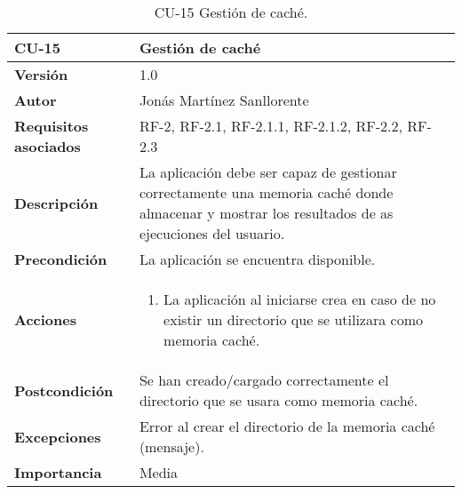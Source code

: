 \begin{table}[p]
	\centering
	\begin{tabularx}{\linewidth}{ p{} p{} }
		\toprule
		\textbf{CU-15}    & \textbf{Gestión de caché}\\
		\toprule
		\textbf{Versión}              & 1.0    \\
		\textbf{Autor}                & Jonás Martínez Sanllorente \\
		\textbf{Requisitos asociados} & RF-2, RF-2.1, RF-2.1.1, RF-2.1.2, RF-2.2, RF-2.3 \\
		\textbf{Descripción}          & La aplicación debe ser capaz de gestionar correctamente una memoria caché donde almacenar y mostrar los resultados de as ejecuciones del usuario. \\
		\textbf{Precondición}         & La aplicación se encuentra disponible.\\
		\textbf{Acciones}             &
		\begin{enumerate}
			\def\labelenumi{\arabic{enumi}.}
			\tightlist
			\item La aplicación al iniciarse crea en caso de no existir un directorio que se utilizara como memoria caché.
		\end{enumerate}\\
		\textbf{Postcondición}        & Se han creado/cargado correctamente el directorio que se usara como memoria caché. \\
		\textbf{Excepciones}          & Error al crear el directorio de la memoria caché (mensaje).\\
		\textbf{Importancia}          & Media \\
		\bottomrule
	\end{tabularx}
	\caption{CU-15 Gestión de caché.}
\end{table}

